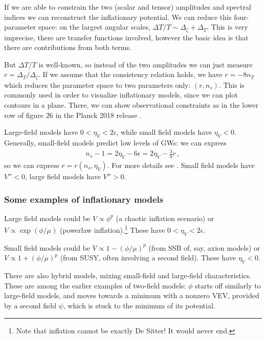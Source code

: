 \documentclass[main.tex]{subfiles}
\begin{document}
If we are able to constrain the two (scalar and tensor) amplitudes and spectral indices we can reconstruct the inflationary potential.  
We can reduce this four-parameter space: on the largest angular scales, \(\Delta T / T \sim \Delta _\zeta + \Delta _T\). This is very imprecise, there are transfer functions involved, however the basic idea is that there are contributions from both terms. 

But \(\Delta T / T\) is well-known, so instead of the two amplitudes we can just measure \(r = \Delta _T / \Delta _\zeta \). 
If we assume that the consistency relation holds, we have \(r = - 8 n_T\)
which reduces the parameter space to two parameters only: \((r, n_s)\). 
This is commonly used in order to visualize inflationary models, since we can plot contours in a plane. 
There, we can show observational constraints as in the lower row of figure 26 in the Planck 2018 release \cite[]{planckcollaborationPlanck2018Results2019}.

Large-field models have \(0 < \eta _V < 2 \epsilon \), while small field models have \(\eta _V < 0\). 
Generally, small-field models predict low levels of GWs: we can express 
%
\begin{align}
n_s -1 = 2 \eta _V - 6 \epsilon = 2 \eta _V - \frac{3}{8} r
\,,
\end{align}
%
so we can express \(r = r (n_s, \eta _V )\). 
For more details see \textcite[]{kinneyNewConstraintsInflation2000}.
Small field models have \(V'' < 0\), large field models have \(V'' > 0\). 

\subsubsection{Some examples of inflationary models}

Large field models could be \(V \propto \phi^{p}\) (a chaotic inflation scenario) or \(V \propto \exp(\phi / \mu )\) (powerlaw inflation).\footnote{Note that inflation cannot be exactly De Sitter! It would never end.} These have \(0 < \eta _V < 2 \epsilon \). 

Small field models could be \(V \propto
1 - (\phi / \mu )^{p}\) (from SSB of, say, axion models) or \(V \propto 1 + (\phi / \mu )^{p}\) (from SUSY, often involving a second field). 
These have \(\eta _V < 0 \). 

There are also hybrid models, mixing small-field and large-field characteristics.
These are among the earlier examples of two-field models: \(\phi \) starts off similarly to large-field models, and moves towards a minimum with a nonzero VEV, provided by a second field \(\psi \), which is stuck to the minimum of its potential.
\end{document}
